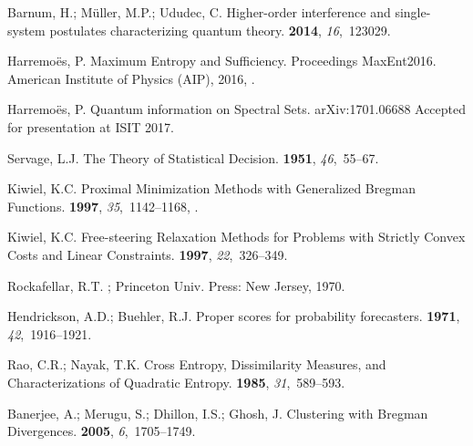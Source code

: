 \documentclass[10pt,a4paper,draft]{article}
\begin{document}
\begin{thebibliography}{-------}
Barnum, H.; M{\"u}ller, M.P.; Ududec, C.
\newblock Higher-order interference and single-system postulates characterizing
  quantum theory.
 {\bf 2014}, {\em 16},~123029.

Harremo{\"e}s, P.
\newblock Maximum Entropy and Sufficiency.
\newblock  Proceedings MaxEnt2016. American Institute of Physics (AIP),  2016,
  \href{http://xxx.lanl.gov/abs/arXiv:1607.02259}{{\normalfont
  [arXiv:1607.02259]}}.

Harremo{\"e}s, P.
\newblock Quantum information on Spectral Sets.
\newblock arXiv:1701.06688 Accepted for presentation at ISIT 2017.

Servage, L.J.
\newblock The Theory of Statistical Decision.
 {\bf 1951},
  {\em 46},~55--67.

Kiwiel, K.C.
\newblock Proximal Minimization Methods with Generalized Bregman Functions.
 {\bf 1997}, {\em
  35},~1142--1168,
  \href{http://xxx.lanl.gov/abs/http://dx.doi.org/10.1137/S0363012995281742}{{}}.

Kiwiel, K.C.
\newblock Free-steering Relaxation Methods for Problems with Strictly Convex
  Costs and Linear Constraints.
 {\bf 1997}, {\em 22},~326--349.

Rockafellar, R.T.
; Princeton Univ. Press: New Jersey,  1970.

Hendrickson, A.D.; Buehler, R.J.
\newblock Proper scores for probability forecasters.
 {\bf 1971}, {\em 42},~1916--1921.

Rao, C.R.; Nayak, T.K.
\newblock Cross Entropy, Dissimilarity Measures, and Characterizations of
  Quadratic Entropy.
 {\bf 1985}, {\em 31},~589--593.

Banerjee, A.; Merugu, S.; Dhillon, I.S.; Ghosh, J.
\newblock Clustering with {B}regman Divergences.
 {\bf 2005}, {\em
  6},~1705--1749.


\end{thebibliography}
\end{document}
